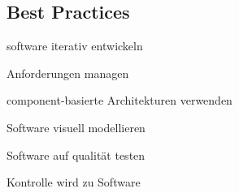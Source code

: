 \subsection{Best Practices}
\begin{compactitem}
    \item software iterativ entwickeln
    \item Anforderungen managen
    \item component-basierte Architekturen verwenden
    \item Software visuell modellieren
    \item Software auf qualität testen
    \item Kontrolle wird zu Software
\end{compactitem}
